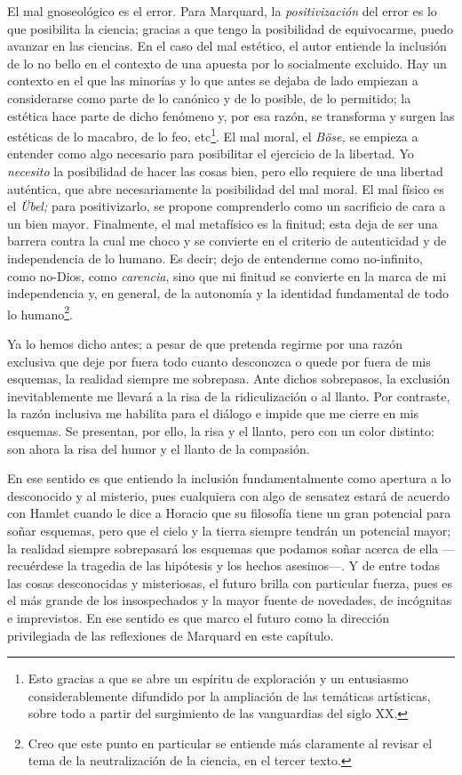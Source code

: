 \begin{refsection}
El mal gnoseológico es el error. Para Marquard, la \emph{positivización} del error es lo que posibilita la ciencia; gracias a que tengo la posibilidad de equivocarme, puedo avanzar en las ciencias. En el caso del mal estético, el autor entiende la inclusión de lo no bello en el contexto de una apuesta por lo socialmente excluido. Hay un contexto en el que las minorías y lo que antes se dejaba de lado empiezan a considerarse como parte de lo canónico y de lo posible, de lo permitido; la estética hace parte de dicho fenómeno y, por esa razón, se transforma y surgen las estéticas de lo macabro, de lo feo, etc\footnote{Esto gracias a que se abre un espíritu de exploración y un entusiasmo considerablemente difundido por la ampliación de las temáticas artísticas, sobre todo a partir del surgimiento de las vanguardias del siglo XX.}. El mal moral, el \emph{Böse,} se empieza a entender como algo necesario para posibilitar el ejercicio de la libertad. Yo \emph{necesito} la posibilidad de hacer las cosas bien, pero ello requiere de una libertad auténtica, que abre necesariamente la posibilidad del mal moral. El mal físico es el \emph{Übel;} para positivizarlo, se propone comprenderlo como un sacrificio de cara a un bien mayor. Finalmente, el mal metafísico es la finitud; esta deja de ser una barrera contra la cual me choco y se convierte en el criterio de autenticidad y de independencia de lo humano. Es decir; dejo de entenderme como no-infinito, como no-Dios, como \emph{carencia}, sino que mi finitud se convierte en la marca de mi independencia y, en general, de la autonomía y la identidad fundamental de todo lo humano\footnote{Creo que este punto en particular se entiende más claramente al revisar el tema de la neutralización de la ciencia, en el tercer texto.}.

Ya lo hemos dicho antes; a pesar de que pretenda regirme por una razón exclusiva que deje por fuera todo cuanto desconozca o quede por fuera de mis esquemas, la realidad siempre me sobrepasa. Ante dichos sobrepasos, la exclusión inevitablemente me llevará a la risa de la ridiculización o al llanto. Por contraste, la razón inclusiva me habilita para el diálogo e impide que me cierre en mis esquemas. Se presentan, por ello, la risa y el llanto, pero con un color distinto: son ahora la risa del humor y el llanto de la compasión.



En ese sentido es que entiendo la inclusión fundamentalmente como apertura a lo desconocido y al misterio, pues cualquiera con algo de sensatez estará de acuerdo con Hamlet cuando le dice a Horacio que su filosofía tiene un gran potencial para soñar esquemas, pero que el cielo y la tierra siempre tendrán un potencial mayor; la realidad siempre sobrepasará los esquemas que podamos soñar acerca de ella ---recuérdese la tragedia de las hipótesis y los hechos asesinos---. Y de entre todas las cosas desconocidas y misteriosas, el futuro brilla con particular fuerza, pues es el más grande de los insospechados y la mayor fuente de novedades, de incógnitas e imprevistos. En ese sentido es que marco el futuro como la dirección privilegiada de las reflexiones de Marquard en este capítulo.


\end{refsection}
